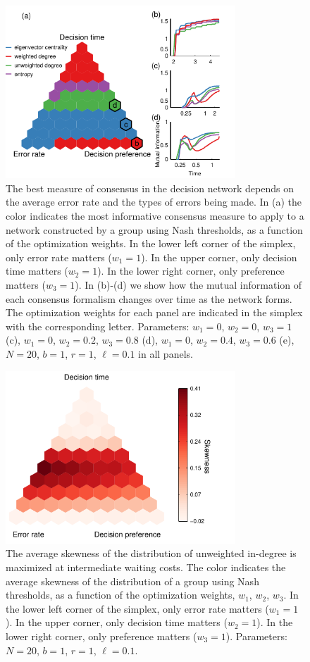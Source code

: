 \documentclass{pnastwo}
\begin{document}
\begin{figure}[htp]
\includegraphics[width=3.4in]{Figure3.pdf}
\caption{\label{bestmetric} The best measure of consensus in the decision network depends on the average error rate and the types of errors being made.  In (a) the color indicates the most informative consensus measure to apply to a network constructed by a group using Nash thresholds, as a function of the optimization weights. In the lower left corner of the simplex, only error rate matters ($w_1=1$).  In the upper corner, only decision time matters ($w_2=1$).  In the lower right corner, only preference matters ($w_3=1$). In (b)-(d) we show how the mutual information of each consensus formalism changes over time as the network forms. The optimization weights for each panel are indicated in the simplex with the corresponding letter. Parameters: $w_1=0$, $w_2=0$, $w_3=1$ (c), $w_1=0$, $w_2=0.2$, $w_3=0.8$ (d), $w_1=0$, $w_2=0.4$, $w_3=0.6$ (e),  $N=20$, $b=1$, $r=1$, $\ell=0.1$ in all panels.}
\end{figure}


\begin{figure}[htp]
\includegraphics[width=3.4in]{Figure4}
\caption{\label{skewness} The average skewness of the distribution of unweighted in-degree is maximized at intermediate waiting costs. The color indicates the average skewness of the distribution of a group using Nash thresholds, as a function of the optimization weights, $w_1$, $w_2$, $w_3$. In the lower left corner of the simplex, only error rate matters ($w_1=1$).  In the upper corner, only decision time matters ($w_2=1$).  In the lower right corner, only preference matters ($w_3=1$). Parameters: $N=20$, $b=1$, $r=1$, $\ell=0.1$.}
\end{figure}
\end{document}

